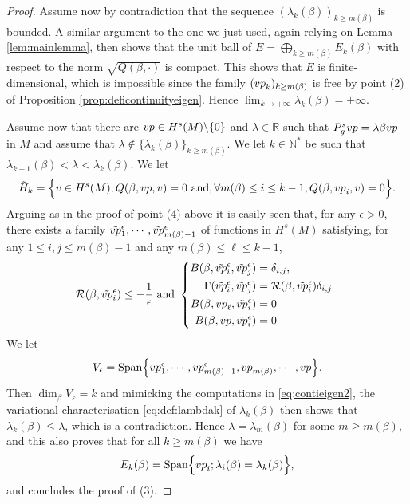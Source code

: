 \documentclass[10pt,a4paper]{amsart}
\def\ep{{\varepsilon}}
\newcommand{\N}{\mathbb{N}}
\newcommand{\R}{\mathbb{R}}
\newcommand{\vp}{{\rm vp}}
\begin{document}
\begin{proof}
Assume now by contradiction that the sequence $(\lambda_k(\beta))_{k\ge m(\beta)}$ is bounded. A similar argument to the one we just used, again relying on Lemma \ref{lem:mainlemma}, then shows that the unit ball of $E = \overline{\bigoplus_{k\geq m(\beta)} E_k(\beta)}$ with respect to the norm $\sqrt{Q(\beta,\cdot)}$ is compact. This shows that $E$ is finite-dimensional, which is impossible since the family $(\vp_k)_{k\ge m(\beta)}$ is free by point (2) of Proposition  \ref{prop:deficontinuityeigen}. Hence $\lim_{k \to +\infty} \lambda_k(\beta) = + \infty$. 

Assume now that there are $\vp\in H^s(M) \backslash \{0\}$ and $\lambda\in \R$ such that $P_g^s \vp = \lambda \beta \vp$ in $M$ and assume that $\lambda \not \in \{\lambda_k(\beta)\}_{k \ge m(\beta)}$. We let $k \in \N^*$ be such that $\lambda_{k-1}(\beta)<  \lambda < \lambda_k(\beta) $. We let 
$$ \tilde{H}_k = \Big \{ v \in H^s(M) ; Q(\beta, \vp, v) = 0 \text{ and}, \forall m(\beta)\leq i \leq k-1,  Q(\beta,\vp_i,v) = 0  \Big \} .$$
Arguing as in the proof of point (4) above it is easily seen that, for any $\epsilon >0$, there exists a family $\tilde{\vp}_1^{\epsilon}, \cdots, \tilde{\vp}_{m(\beta)-1}^{\epsilon}$ of functions in $H^s(M)$ satisfying, for any $ 1 \leq i,j \leq m(\beta)-1$ and any  $m(\beta) \leq \ell \leq k-1$,
$$
 \mathcal{R}(\beta,\tilde{\vp}_i^{\epsilon})  \leq -\frac{1}{\epsilon} \text{ and } \left \{
 \begin{aligned}
B(\beta,\tilde{\vp}_i^{\epsilon},\tilde{\vp}_j^{\epsilon}) & = \delta_{i,j}, \\
\Gamma(\tilde{\vp}_i^{\epsilon},\tilde{\vp}_j^{\epsilon}) & = \mathcal{R}(\beta,\tilde{\vp}_i^{\epsilon}) \delta_{i,j} \\
  B(\beta,\vp_\ell, \tilde{\vp}_i^{\epsilon}) & = 0 \\
  B(\beta, \vp,  \tilde{\vp}_i^{\epsilon})& = 0
 \end{aligned}\right. . $$
We let
$$V_{\epsilon}  = \text{Span} \Big \{ \tilde{\vp}_1^{\epsilon},\cdots,\tilde{\vp}_{m(\beta)-1}^{\epsilon},\vp_{m(\beta)},\cdots, \vp \Big \}. $$
Then $\dim_{\beta} V_\ep = k$ and mimicking the computations in \eqref{eq:contieigen2}, the variational characterisation \eqref{eq:def:lambdak} of $\lambda_k(\beta)$ then shows that $\lambda_k(\beta) \le \lambda$, which is a contradiction. Hence $\lambda = \lambda_m(\beta)$ for some $m \ge m(\beta)$, and this also proves that for all $k \ge m(\beta)$ we have 
$$ E_k(\beta) = \text{Span} \Big \{  \vp_i ; \lambda_i(\beta) = \lambda_k(\beta) \Big \}, $$
and concludes the proof of (3). 


\end{proof}
\end{document}
